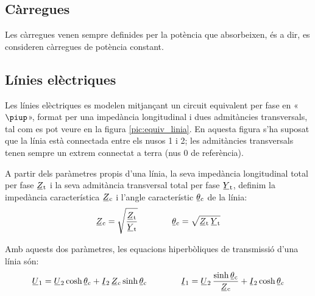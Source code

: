 \subsection{Càrregues}

Les càrregues venen sempre definides per la potència que absorbeixen, és a dir, es consideren càrregues de potència constant.

\subsection{Línies elèctriques} 

Les línies elèctriques es modelen mitjançant un circuit equivalent
per fase en «$\piup$», format per una impedància longitudinal i dues
admitàncies transversals, tal com es pot veure en la figura
\vref{pic:equiv_linia}. En aquesta figura s'ha suposat que la línia
està connectada entre els nusos 1 i 2; les admitàncies transversals
tenen sempre un extrem connectat a terra (nus 0 de referència).

\begin{center}
    
    \label{pic:equiv_linia}
\end{center}

A partir dels paràmetres propis d'una línia, la seva impedància
longitudinal  total per fase $\cmplx{Z}\ped{t}$ i la seva admitància
transversal total per fase $\cmplx{Y}\ped{t}$, definim la impedància
característica $\cmplx{Z}\ped{c}$ i l'angle característic
$\cmplx{\theta}\ped{c}$ de la línia:   
\begin{equation}
   \cmplx{Z}\ped{c} = \sqrt{\frac{\cmplx{Z}\ped{t}}{\cmplx{Y}\ped{t}}} \qquad \qquad
   \cmplx{\theta}\ped{c} = \sqrt{\cmplx{Z}\ped{t} \,\cmplx{Y}\ped{t} }
\end{equation}

Amb aquests dos paràmetres, les equacions hiperbòliques de
transmissió d'una línia són: 
\begin{equation}\label{eq:linia_eq_trans}
   \cmplx{U}_1 = \cmplx{U}_2 \cosh \cmplx{\theta}\ped{c}  + \cmplx{I}_2 \,\cmplx{Z}\ped{c} \sinh \cmplx{\theta}\ped{c}   \qquad \qquad
   \cmplx{I}_1 = \cmplx{U}_2 \, \frac{\sinh \cmplx{\theta}\ped{c}}{\cmplx{Z}\ped{c}}  +   \cmplx{I}_2 \cosh \cmplx{\theta}\ped{c}
\end{equation}

